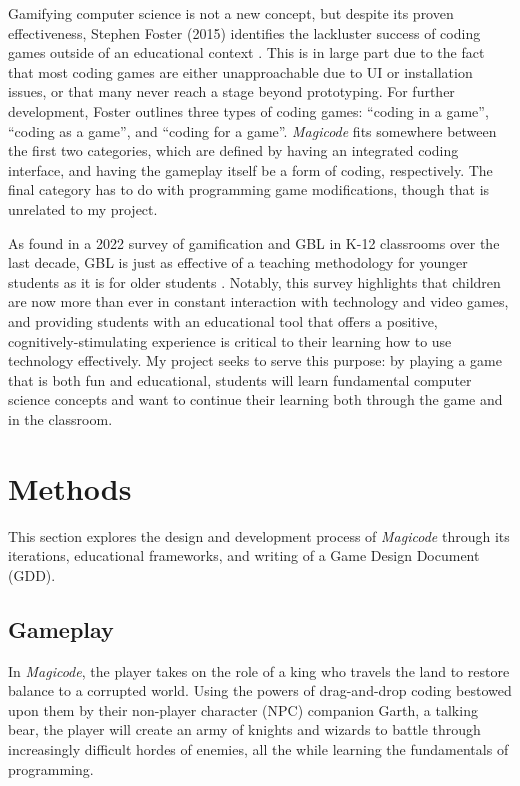 \documentclass[10pt,twocolumn]{article}
\begin{document}
Gamifying computer science is not a new concept, but despite its proven effectiveness, Stephen Foster (2015) identifies the lackluster success of coding games outside of an educational context \cite{coding-game-design}. This is in large part due to the fact that most coding games are either unapproachable due to UI or installation issues, or that many never reach a stage beyond prototyping. For further development, Foster outlines three types of coding games: “coding in a game”, “coding as a game”, and “coding for a game”. \textit{Magicode} fits somewhere between the first two categories, which are defined by having an integrated coding interface, and having the gameplay itself be a form of coding, respectively. The final category has to do with programming game modifications, though that is unrelated to my project.

As found in a 2022 survey of gamification and GBL in K-12 classrooms over the last decade, GBL is just as effective of a teaching methodology for younger students as it is for older students \cite{guan-gbl}. Notably, this survey highlights that children are now more than ever in constant interaction with technology and video games, and providing students with an educational tool that offers a positive, cognitively-stimulating experience is critical to their learning how to use technology effectively. My project seeks to serve this purpose: by playing a game that is both fun and educational, students will learn fundamental computer science concepts and want to continue their learning both through the game and in the classroom.



\section{Methods}
This section explores the design and development process of \textit{Magicode} through its iterations, educational frameworks, and writing of a Game Design Document (GDD).


\subsection{Gameplay}
In \textit{Magicode}, the player takes on the role of a king who travels the land to restore balance to a corrupted world. Using the powers of drag-and-drop coding bestowed upon them by their non-player character (NPC) companion Garth, a talking bear, the player will create an army of knights and wizards to battle through increasingly difficult hordes of enemies, all the while learning the fundamentals of programming.
\end{document}
